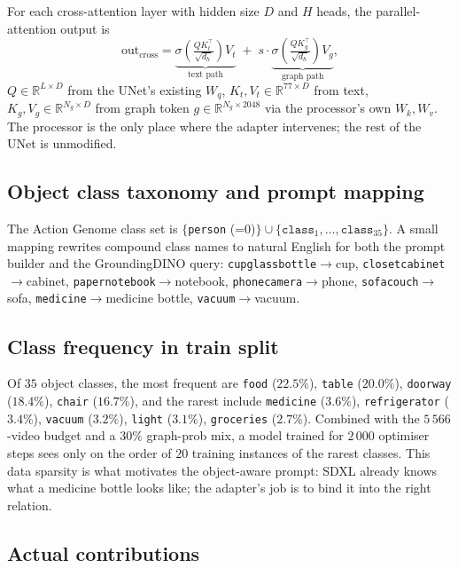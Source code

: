 \documentclass[11pt]{article}
\begin{document}
For each cross-attention layer with hidden size $D$ and $H$ heads,
the parallel-attention output is
\[
\mathrm{out}_{\text{cross}}
= \underbrace{\sigma\!\left(\tfrac{Q K_t^\top}{\sqrt{d_h}}\right) V_t}_{\text{text path}}
\;+\; s\cdot
  \underbrace{\sigma\!\left(\tfrac{Q K_g^\top}{\sqrt{d_h}}\right) V_g}_{\text{graph path}},
\]
$Q\in\mathbb{R}^{L\times D}$ from the UNet's existing $W_q$,
$K_t,V_t\in\mathbb{R}^{77\times D}$ from text, $K_g,V_g\in\mathbb{R}^{N_g\times D}$
from graph token $g\in\mathbb{R}^{N_g\times 2048}$ via the
processor's own $W_k,W_v$. The processor is the only place where the
adapter intervenes; the rest of the UNet is unmodified.

\subsection{Object class taxonomy and prompt mapping}

The Action Genome class set is $\{$\texttt{person} (=0)$\}\cup
\{\texttt{class}_1,\dots,\texttt{class}_{35}\}$. A small mapping rewrites
compound class names to natural English for both the prompt builder
and the GroundingDINO query:
\texttt{cupglassbottle}$\!\to\!$cup,
\texttt{closetcabinet}$\!\to\!$cabinet,
\texttt{papernotebook}$\!\to\!$notebook,
\texttt{phonecamera}$\!\to\!$phone,
\texttt{sofacouch}$\!\to\!$sofa,
\texttt{medicine}$\!\to\!$medicine bottle,
\texttt{vacuum}$\!\to\!$vacuum.

\subsection{Class frequency in train split}

Of $35$ object classes, the most frequent are
\texttt{food} ($22.5\%$), \texttt{table} ($20.0\%$),
\texttt{doorway} ($18.4\%$), \texttt{chair} ($16.7\%$), and the rarest
include \texttt{medicine} ($3.6\%$), \texttt{refrigerator} ($3.4\%$),
\texttt{vacuum} ($3.2\%$), \texttt{light} ($3.1\%$),
\texttt{groceries} ($2.7\%$). Combined with the $5\,566$-video budget
and a $30\%$ graph-prob mix, a model trained for $2\,000$ optimiser
steps sees only on the order of $20$ training instances of the rarest
classes. This data sparsity is what motivates the object-aware prompt:
SDXL already knows what a medicine bottle looks like;
the adapter's job is to bind it into the right relation.

\subsection{Actual contributions}
\end{document}

